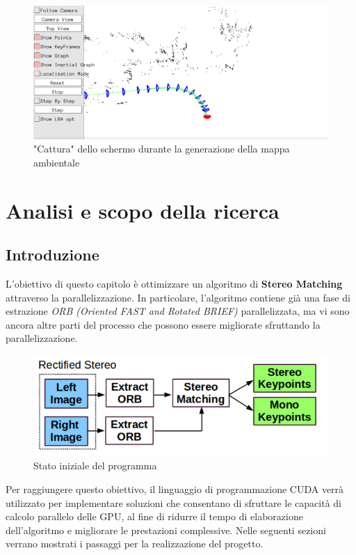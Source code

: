 \documentclass[12pt,a4paper]{report}
\begin{document}
\begin{figure}[h]
    \centering
    \includegraphics[width=1\linewidth]{img/map_viewer.png}
    \caption{"Cattura" dello schermo durante la generazione della mappa ambientale}
\end{figure}




\chapter{Analisi e scopo della ricerca}

\section{Introduzione}

L'obiettivo di questo capitolo è ottimizzare un algoritmo di \textbf{Stereo Matching} attraverso la parallelizzazione. In particolare, l'algoritmo contiene già una fase di estrazione \textit{ORB (Oriented FAST and Rotated BRIEF)} parallelizzata, ma vi sono ancora altre parti del processo che possono essere migliorate sfruttando la parallelizzazione.

\begin{figure}[h]
    \centering
    \includegraphics[width=0.7\linewidth]{img/start_point_opt.png}
    \caption{Stato iniziale del programma \cite{ORB_SLAM_2}}
\end{figure}


Per raggiungere questo obiettivo, il linguaggio di programmazione CUDA verrà utilizzato per implementare soluzioni che consentano di sfruttare le capacità di calcolo parallelo delle GPU, al fine di ridurre il tempo di elaborazione dell'algoritmo e migliorare le prestazioni complessive.
Nelle seguenti sezioni verrano mostrati i passaggi per la realizzazione del progetto.
\end{document}
